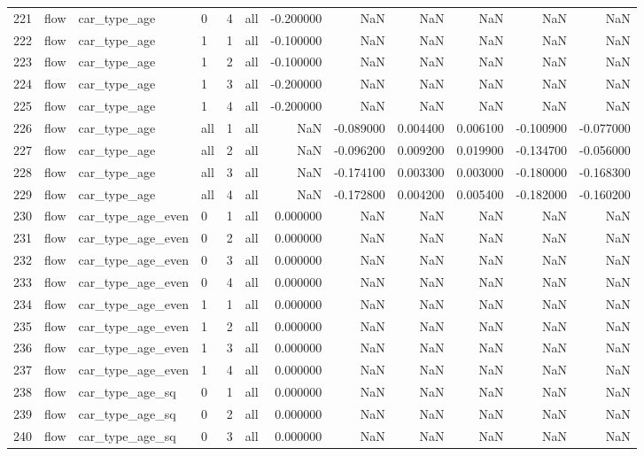 \begin{tabular}{llllllrrrrrr}
221 & flow & car_type_age & 0 & 4 & all & -0.200000 & NaN & NaN & NaN & NaN & NaN \\
222 & flow & car_type_age & 1 & 1 & all & -0.100000 & NaN & NaN & NaN & NaN & NaN \\
223 & flow & car_type_age & 1 & 2 & all & -0.100000 & NaN & NaN & NaN & NaN & NaN \\
224 & flow & car_type_age & 1 & 3 & all & -0.200000 & NaN & NaN & NaN & NaN & NaN \\
225 & flow & car_type_age & 1 & 4 & all & -0.200000 & NaN & NaN & NaN & NaN & NaN \\
226 & flow & car_type_age & all & 1 & all & NaN & -0.089000 & 0.004400 & 0.006100 & -0.100900 & -0.077000 \\
227 & flow & car_type_age & all & 2 & all & NaN & -0.096200 & 0.009200 & 0.019900 & -0.134700 & -0.056000 \\
228 & flow & car_type_age & all & 3 & all & NaN & -0.174100 & 0.003300 & 0.003000 & -0.180000 & -0.168300 \\
229 & flow & car_type_age & all & 4 & all & NaN & -0.172800 & 0.004200 & 0.005400 & -0.182000 & -0.160200 \\
230 & flow & car_type_age_even & 0 & 1 & all & 0.000000 & NaN & NaN & NaN & NaN & NaN \\
231 & flow & car_type_age_even & 0 & 2 & all & 0.000000 & NaN & NaN & NaN & NaN & NaN \\
232 & flow & car_type_age_even & 0 & 3 & all & 0.000000 & NaN & NaN & NaN & NaN & NaN \\
233 & flow & car_type_age_even & 0 & 4 & all & 0.000000 & NaN & NaN & NaN & NaN & NaN \\
234 & flow & car_type_age_even & 1 & 1 & all & 0.000000 & NaN & NaN & NaN & NaN & NaN \\
235 & flow & car_type_age_even & 1 & 2 & all & 0.000000 & NaN & NaN & NaN & NaN & NaN \\
236 & flow & car_type_age_even & 1 & 3 & all & 0.000000 & NaN & NaN & NaN & NaN & NaN \\
237 & flow & car_type_age_even & 1 & 4 & all & 0.000000 & NaN & NaN & NaN & NaN & NaN \\
238 & flow & car_type_age_sq & 0 & 1 & all & 0.000000 & NaN & NaN & NaN & NaN & NaN \\
239 & flow & car_type_age_sq & 0 & 2 & all & 0.000000 & NaN & NaN & NaN & NaN & NaN \\
240 & flow & car_type_age_sq & 0 & 3 & all & 0.000000 & NaN & NaN & NaN & NaN & NaN \\

\end{tabular}
